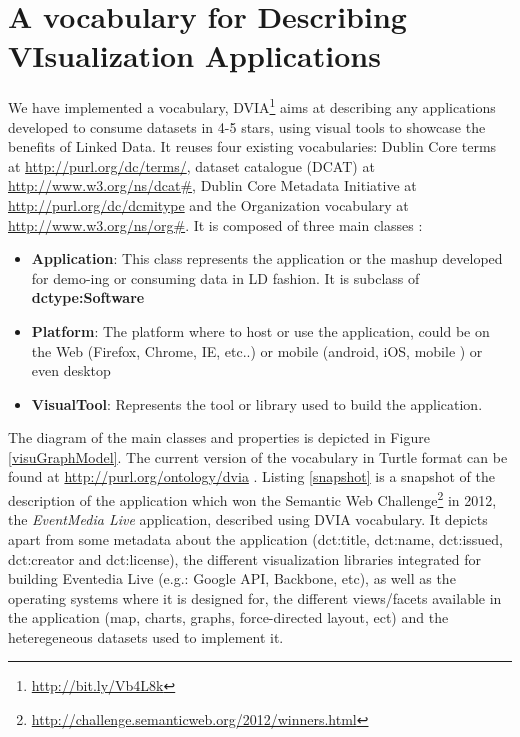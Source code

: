 
\section{A vocabulary for Describing VIsualization Applications} \label{sec:dvia}

We have implemented a vocabulary, DVIA\footnote{\url{http://bit.ly/Vb4L8k}} aims at describing any applications developed to consume datasets in 4-5 stars, using visual tools to showcase the benefits of Linked Data. It reuses four existing vocabularies: Dublin Core terms at \url{http://purl.org/dc/terms/}, dataset catalogue (DCAT) at \url{http://www.w3.org/ns/dcat#}, Dublin Core Metadata Initiative at \url{http://purl.org/dc/dcmitype} and the Organization vocabulary at \url{http://www.w3.org/ns/org#}.  It is composed of three main classes : 

\begin{itemize}
\item \textbf{Application}: This class represents the application or the mashup developed for demo-ing or consuming data in LD fashion. It is subclass of \textbf{dctype:Software}
\item \textbf{Platform}: The platform where to host or use the application, could be on the Web (Firefox, Chrome, IE, etc..) or mobile (android, iOS, mobile ) or even desktop
\item \textbf{VisualTool}: Represents the tool or library used to build the application. 
\end{itemize}

The diagram of the main classes and properties is depicted in Figure \ref{visuGraphModel}. The current version of the vocabulary in Turtle format can be found at \url{http://purl.org/ontology/dvia} .  Listing \ref{snapshot} is a snapshot of the description of the application which won the Semantic Web Challenge\footnote{\url{http://challenge.semanticweb.org/2012/winners.html}} in 2012, the \textit{EventMedia Live} application, described using DVIA vocabulary. It depicts apart from some metadata about the application (dct:title, dct:name, dct:issued, dct:creator and dct:license), the different visualization libraries integrated for building Eventedia Live (e.g.: Google API, Backbone, etc), as well as the operating systems where it is designed for, the different views/facets available in the application (map, charts, graphs, force-directed layout, ect) and the heteregeneous datasets used to implement it. 

